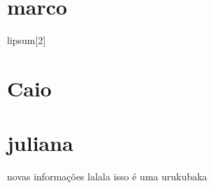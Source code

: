 
    \section{marco}
    lipsum[2]
    \section{Caio}
    \section{juliana}
    novas informações
    lalala
    isso é uma urukubaka













